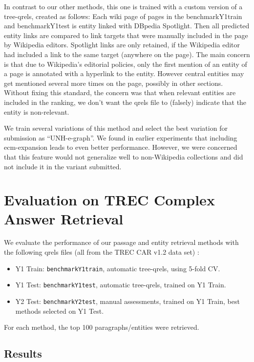 \documentclass{article}
\begin{document}
In contrast to our other methods, this one is trained with a custom version of a tree-qrels, created as follows: Each wiki page of pages in the benchmarkY1train and benchmarkY1test is entity linked with DBpedia Spotlight. Then all predicted entity links are compared to link targets that were manually included in the page by Wikipedia editors. Spotlight links are only retained, if the Wikipedia editor had included a link to the same target (anywhere on the page).  The main concern is that due to Wikipedia's editorial policies, only the first mention of an entity of a page is annotated with a hyperlink to the entity. However central entities may get mentioned several more times on the page, possibly in other sections. Without fixing this standard, the concern was that when relevant entities are included in the ranking, we don't want the qrels file to (falsely) indicate that the entity is non-relevant.

We train several variations of this method and select the best variation for submission as ``UNH-e-graph''. We found in earlier experiments that including ecm-expansion leads to even better performance. However, we were concerned that this feature would not generalize well to non-Wikipedia collections and did not include it in the variant submitted.


\section{Evaluation on TREC Complex Answer Retrieval}


We evaluate the performance of our passage and entity retrieval methods with the following qrels files (all from the TREC CAR v1.2 data set) \cite{trecdata21}:

\begin{itemize}
    \item Y1 Train: \texttt{benchmarkY1train}, automatic tree-qrels, using 5-fold CV.
    \item Y1 Test: \texttt{benchmarkY1test}, automatic tree-qrels, trained on Y1 Train.
    \item Y2 Test: \texttt{benchmarkY2test}, manual assessments, trained on Y1 Train, best methods selected on Y1 Test.
\end{itemize}

For each method, the top 100 paragraphs/entities were retrieved.

\subsection{Results}
\end{document}
